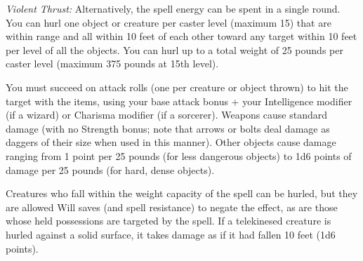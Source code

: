 \textit{Violent Thrust:} Alternatively, the spell energy can be spent in a single 
round. You can hurl one object or creature per caster level (maximum 15) that are 
within range and all within 10 feet of each other toward any target within 10 feet 
per level of all the objects. You can hurl up to a total weight of 25 pounds per 
caster level (maximum 375 pounds at 15th level).

You must succeed on attack rolls (one per creature or object thrown) to hit the 
target with the items, using your base attack bonus + your Intelligence modifier 
(if a wizard) or Charisma modifier (if a sorcerer). Weapons cause standard damage 
(with no Strength bonus; note that arrows or bolts deal damage as daggers of their 
size when used in this manner). Other objects cause damage ranging from 1 point 
per 25 pounds (for less dangerous objects) to 1d6 points of damage per 25 pounds 
(for hard, dense objects).

Creatures who fall within the weight capacity of the spell can be hurled, but they 
are allowed Will saves (and spell resistance) to negate the effect, as are those 
whose held possessions are targeted by the spell. If a telekinesed creature is 
hurled against a solid surface, it takes damage as if it had fallen 10 feet (1d6 
points).

